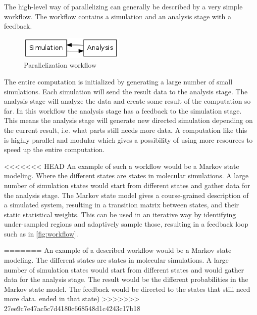 The high-level way of parallelizing can generally be described by a very
simple workflow. The workflow contains a simulation and an analysis
stage with a feedback. 

\begin{figure}[H]  
  \centering
  \includegraphics{Chapters/IntroductionIncludes/workflow.png}
  \caption{Parallelization workflow}
  \label{fig:workflow}
\end{figure}

The entire computation is initialized by generating a large number of
small simulations. Each simulation will send the result data to the
analysis stage. The analysis stage will analyze the data and create
some result of the computation so far. In this workflow the analysis
stage has a feedback to the simulation stage. This means the analysis
stage will generate new directed simulation depending on the current
result, i.e. what parts still needs more data. A computation like this
is highly parallel and modular which gives a possibility of using more
resources to speed up the entire computation.

<<<<<<< HEAD
An example of such a workflow would be a Markov state modeling. Where
the different states are states in molecular simulations. A large
number of simulation states would start from different states and
gather data for the analysis stage. The Markov state model gives a
course-grained description of a simulated system, resulting in a
transition matrix between states, and their static statistical
weights. This can be used in an iterative way by identifying
under-sampled regions and adaptively sample those, resulting in a
feedback loop such as in \autoref{fig:workflow}.

=======
An example of a described workflow would be a Markov state
modeling. The different states are states in molecular simulations. A
large number of simulation states would start from different states
and would gather data for the analysis stage. The result would be the
different probabilities in the Markov state model. The feedback would
be directed to the states that still need more data.%
ended in that state)
>>>>>>> 27ee9c7e47ac5c7d4180c668548d1c4243c17b18

